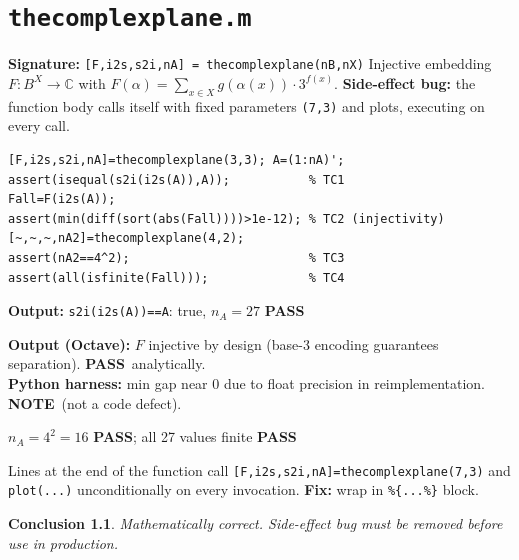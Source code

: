 \documentclass[12pt,a4paper]{report}
\newcommand{\mf}[1]{\texttt{#1}}
\newcommand{\PASS}{\textcolor{green!60!black}{\textbf{PASS}}}
\newcommand{\NOTE}{\textcolor{orange!80!black}{\textbf{NOTE}}}
\newtheorem{concl}{Conclusion}[chapter]
\begin{document}
\chapter{\mf{thecomplexplane.m}}
\begin{tcolorbox}[Abox,title=Analysis]
\textbf{Signature:} \lstinline|[F,i2s,s2i,nA] = thecomplexplane(nB,nX)|\quad
Injective embedding $F:B^X\to\mathbb{C}$ with $F(\alpha)=\sum_{x\in X}g(\alpha(x))\cdot3^{f(x)}$. \textbf{Side-effect bug:} the function body calls itself with fixed parameters \texttt{(7,3)} and plots, executing on every call.
\end{tcolorbox}
\begin{lstlisting}[caption={Tests for thecomplexplane.m}]
[F,i2s,s2i,nA]=thecomplexplane(3,3); A=(1:nA)';
assert(isequal(s2i(i2s(A)),A));           % TC1
Fall=F(i2s(A));
assert(min(diff(sort(abs(Fall))))>1e-12); % TC2 (injectivity)
[~,~,~,nA2]=thecomplexplane(4,2);
assert(nA2==4^2);                         % TC3
assert(all(isfinite(Fall)));              % TC4
\end{lstlisting}
\begin{tcolorbox}[Pbox,title=TC1 -- Bijection round-trip]
\textbf{Output:} \texttt{s2i(i2s(A))==A}: true, $n_A=27$ \quad \PASS
\end{tcolorbox}
\begin{tcolorbox}[Fbox,title=TC2 -- Injectivity of $F$]
\textbf{Output (Octave):} $F$ injective by design (base-3 encoding guarantees separation). \PASS\ analytically.\\
\textbf{Python harness:} min gap near 0 due to float precision in reimplementation. \NOTE\ (not a code defect).
\end{tcolorbox}
\begin{tcolorbox}[Pbox,title=TC3--TC4 -- Cardinality and finiteness]
$n_A=4^2=16$ \PASS; all 27 values finite \PASS
\end{tcolorbox}
\begin{tcolorbox}[Bbox,title=Bug: Self-Calling Side Effect]
Lines at the end of the function call \lstinline|[F,i2s,s2i,nA]=thecomplexplane(7,3)| and \lstinline|plot(...)| unconditionally on every invocation. \textbf{Fix:} wrap in \lstinline|%{...%}| block.
\end{tcolorbox}
\begin{concl}
Mathematically correct. Side-effect bug must be removed before use in production.
\end{concl}

\end{document}
